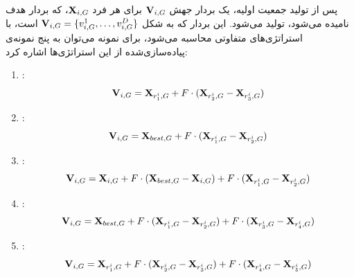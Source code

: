 \documentclass[12pt,a4paper]{article}
\theoremstyle{definition}
\theoremstyle{theorem}
\theoremstyle{definition}
\begin{document}
پس از تولید جمعیت اولیه، یک بردار جهش
\( {\bf{V}}_{i,G} \)
برای هر فرد 
\( {\bf{X}}_{i,G} \)،
 که بردار هدف نامیده می‌شود، تولید می‌شود. این بردار که به شکل 
\( { {\bf{V}}_{i,G} =  \lbrace {v_{i,G}^{1} , \dots , v_{i,G}^{D} } \rbrace } \)
است، با استراتژی‌های متفاوتی محاسبه می‌شود، برای نمونه می‌توان به پنج نمونه‌ی پیاده‌سازی‌شده از این استراتژی‌ها اشاره کرد: 
\begin{enumerate}
\item {} : 
\vspace{-0.2cm}
\begin{equation}
{\bf{V}}_{i,G} = {\bf{X}}_{r_{1}^i , G} + F \cdot ( {\bf{X}}_{r_{2}^i , G} - {\bf{X}}_{r_{3}^i , G} ) 
\end{equation}

\item {} : 
\vspace{-0.2cm}
\begin{equation}
{\bf{V}}_{i,G} = {\bf{X}}_{best , G} + F \cdot ( {\bf{X}}_{r_{1}^i , G} - {\bf{X}}_{r_{2}^i , G} ) 
\end{equation}

\item {} : 
\vspace{-0.2cm}
\begin{equation}
{\bf{V}}_{i,G} = {\bf{X}}_{i , G} + F \cdot ( {\bf{X}}_{best , G} - {\bf{X}}_{i , G} ) +  F \cdot ( {\bf{X}}_{r_{1}^i , G} - {\bf{X}}_{r_{2}^i , G} ) 
\end{equation}

\item {} : 
\vspace{-0.2cm}
\begin{equation}
{\bf{V}}_{i,G} = {\bf{X}}_{best , G} +  F \cdot ( {\bf{X}}_{r_{1}^i , G} - {\bf{X}}_{r_{2}^i , G} )  +  F \cdot ( {\bf{X}}_{r_{3}^i , G} - {\bf{X}}_{r_{4}^i , G} ) 
\end{equation}
\vspace{0.1cm}

\item {} : 
\begin{equation}
{\bf{V}}_{i,G} = {\bf{X}}_{r_{1}^i , G} +  F \cdot ( {\bf{X}}_{r_{2}^i , G} - {\bf{X}}_{r_{3}^i , G} )  +  F \cdot ( {\bf{X}}_{r_{4}^i , G} - {\bf{X}}_{r_{5}^i , G} ) 
\end{equation}

\end{enumerate}
\end{document}
